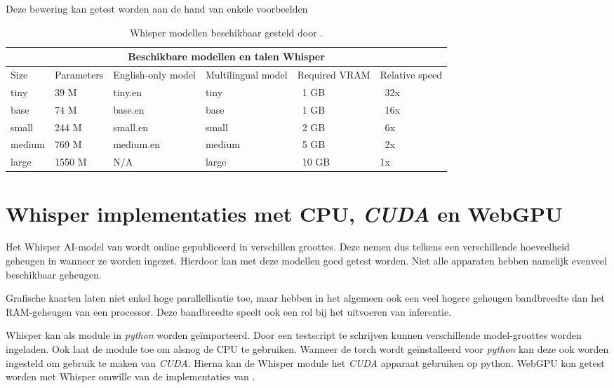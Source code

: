 \bigbreak{}

Deze bewering kan getest worden aan de hand van enkele voorbeelden

\break{}

\begin{table}
    \begin{tabular}{ |p{1.5cm}|p{2.5cm}|p{3cm}|p{3cm}|p{2cm}|p{2cm}|  }
        \hline
        \multicolumn{6}{|c|}{Beschikbare modellen en talen Whisper} \\
        \hline
            Size& Parameters & English-only model & Multilingual model & Required VRAM & Relative speed\\
        \hline
            tiny&       39 M    &tiny.en    & tiny& ~1 GB& ~32x     \\
            base &      74 M	&base.en    & base & ~1 GB & ~16x   \\
            small &     244 M	&small.en   & small & ~2 GB & ~6x   \\
            medium &    769 M	&medium.en  & medium & ~5 GB & ~2x  \\
            large &     1550 M	&N/A        & large & ~10 GB& 	1x  \\
        \hline
    \end{tabular}
    \caption{Whisper modellen beschikbaar gesteld door \textcite{OpenAI2023}.}
    \label{tab:OpenAIWhisperModels}
\end{table}

\section{Whisper implementaties met CPU, \textit{CUDA} en WebGPU}%
\label{sec:whispertest}

Het Whisper AI-model van \textcite{OpenAI2023} wordt online gepubliceerd in verschillen groottes. Deze nemen dus telkens een verschillende hoeveelheid geheugen in wanneer ze worden ingezet. Hierdoor kan met deze modellen goed getest worden. Niet alle apparaten hebben namelijk evenveel beschikbaar geheugen. 

\bigbreak{}

Grafische kaarten laten niet enkel hoge parallellisatie toe, maar hebben in het algemeen ook een veel hogere geheugen bandbreedte dan het RAM-geheugen van een processor. Deze bandbreedte speelt ook een rol bij het uitvoeren van inferentie.

\bigbreak{}

Whisper kan als module in \textit{python} worden geïmporteerd. Door een testscript te schrijven kunnen verschillende model-groottes worden ingeladen. Ook laat de module toe om alsnog de CPU te gebruiken. Wanneer de torch wordt geïnstalleerd voor \textit{python} kan deze ook worden ingesteld om gebruik te maken van \textit{CUDA}. Hierna kan de Whisper module het \textit{CUDA} apparaat gebruiken op python. WebGPU kon getest worden met Whisper omwille van de implementaties van \textcite{Fleetwood2024, Fleetwood2023b}.

